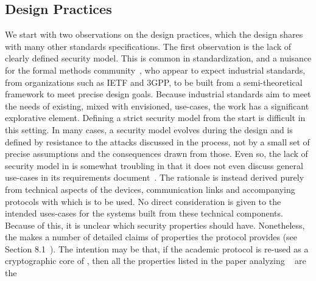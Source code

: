 \documentclass[runningheads,draft,x11names]{llncs}
\begin{document}
\subsection{Design Practices}
\label{sec:designPractices}
We start with two observations on the design practices, which the \mEdhoc{}
design shares with many other standards specifications.
%
The first observation is the lack of clearly defined security model.
%
This is common in standardization, and a nuisance for the formal methods
community~\cite{DBLP:conf/ccs/BasinDHRSS18}, who appear to expect industrial
standards, from organizations such as IETF and 3GPP, to be built from a
semi-theoretical framework to meet precise design goals.
%
Because industrial standards aim to meet the needs of
existing, mixed with envisioned, use-cases, the work has a significant
explorative element.
%
Defining a strict security model from the start is difficult in this setting.
%
In many cases, a security model evolves during the design and is defined
by resistance to the attacks discussed in the process, not by a small set of
precise assumptions and the consequences drawn from those. 
%
Even so, the lack of security model in \mEdhoc{} is somewhat troubling in that it does not even discuss general use-cases in its requirements
document~\cite{ietf-lake-reqs-04}.
%
The rationale is instead derived purely from technical aspects of the devices,
communication links and accompanying protocols with which \mEdhoc{} is to be used.
%
No direct consideration is given to the intended uses-cases for the systems
built from these technical components.
%
Because of this, it is unclear which security properties \mEdhoc{} should have.
%
Nonetheless, the \mSpec{} makes a number of detailed claims of properties
the protocol provides (see Section 8.1~\cite{selander-lake-edhoc-01}).
%
The intention may be that, if the academic protocol \mSigma{} is re-used as a
cryptographic core of \mEdhoc, then all the properties listed
in the paper analyzing \mSigma~\cite{DBLP:conf/crypto/CanettiK02} are the
\end{document}
